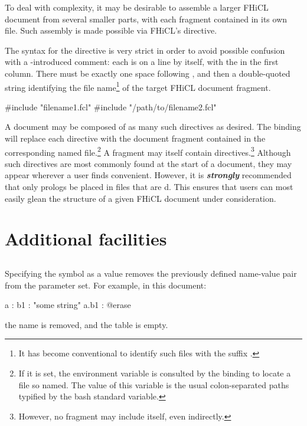 \documentclass[draftmode,draftwater]{memarticle}
\makeatletter
\newcommand{\fhicl}{FHiCL\xspace}
\newcommand{\aterase}{\fclcode{@erase}\xspace}
\makeatother
\begin{document}
To deal with complexity, it may be desirable to assemble a larger
\fhicl document from several smaller parts, with each fragment
contained in its own file.  Such assembly is made possible via
\fhicl's  directive.

The syntax for the directive is very strict in order to avoid possible
confusion with a \fclcode{#}-introduced comment: each
 is on a line by itself, with the \fclcode{#} in the
first column.  There must be exactly one space following
, and then a double-quoted string identifying the
file name\footnote{%
  It has become conventional to identify such files with the suffix
  .%
} of the target \fhicl document fragment.  
%
\Needspace{0.34in}
\begin{fcllisting}[texcl,escapechar=`]
#include "filename1.fcl"
#include "/path/to/filename2.fcl"
\end{fcllisting}

A document may be composed of as many such directives as desired.  The
binding will replace each directive with the document fragment
contained in the corresponding named file.\footnote{%
  If it is set, the environment variable  is
  consulted by the binding to locate a file so named.  The value of
  this variable is the usual colon-separated paths typified by the
  bash standard  variable.%
} A fragment may itself contain 
directives.\footnote{%
  However, no fragment may include itself, even indirectly.%
} Although such directives are most commonly found at the start of a
document, they may appear wherever a user finds convenient.  However,
it is \textbf{\textit{strongly}} recommended that only prologs be
placed in files that are d.  This ensures that users
can most easily glean the structure of a given FHiCL document under
consideration.

\chapter{Additional facilities}

\section{\aterase}

Specifying the \aterase symbol as a value removes the previously
defined name-value pair from the parameter set.  For example, in this
document: \Needspace{0.34in}
\begin{fcllisting}[texcl,escapechar=`]
a : {
   b1 : "some string"
}
a.b1 : @erase
\end{fcllisting}
the name  is removed, and the table  is
empty.
\end{document}
